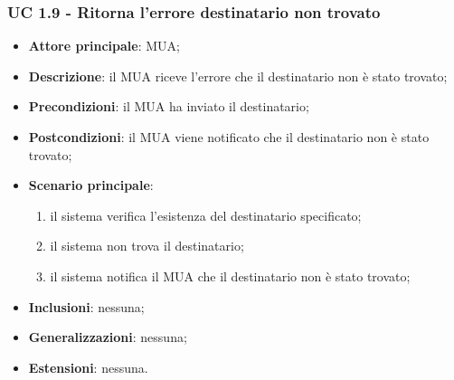     \subsubsection{UC 1.9 - Ritorna l'errore destinatario non trovato} \label{sec:UC1.9}
    \begin{itemize}
        \item \textbf{Attore principale}: MUA;
        \item \textbf{Descrizione}: il MUA riceve l'errore che il destinatario non è stato trovato;
        \item \textbf{Precondizioni}: il MUA ha inviato il destinatario;
        \item \textbf{Postcondizioni}: il MUA viene notificato che il destinatario non è stato trovato;
        \item \textbf{Scenario principale}:
            \begin{enumerate}
                \item il sistema verifica l'esistenza del destinatario specificato;
                \item il sistema non trova il destinatario;
                \item il sistema notifica il MUA che il destinatario non è stato trovato;
            \end{enumerate}
        \item \textbf{Inclusioni}: nessuna;
        \item \textbf{Generalizzazioni}: nessuna;
        \item \textbf{Estensioni}: nessuna.
    \end{itemize}

